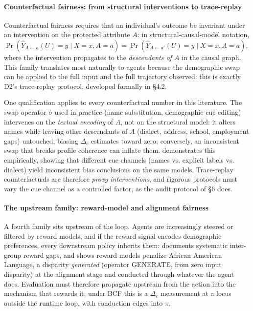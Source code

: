 \documentclass[acmsmall,nonacm]{acmart}
\begin{document}
\paragraph{Counterfactual fairness: from structural interventions to trace-replay}

Counterfactual fairness \cite{kusner2017counterfactual} requires that an individual's outcome be invariant under an intervention on the protected attribute $A$: in structural-causal-model notation, $\Pr(\hat{Y}_{A \leftarrow a}(U) = y \mid X = x, A = a) = \Pr(\hat{Y}_{A \leftarrow a'}(U) = y \mid X = x, A = a)$, where the intervention propagates to the \emph{descendants of $A$} in the causal graph. This family translates most naturally to agents because the demographic swap can be applied to the full input and the full trajectory observed: this is exactly D2's trace-replay protocol, developed formally in \S{}4.2.

One qualification applies to every counterfactual number in this literature. The swap operator $\sigma$ used in practice (name substitution, demographic-cue editing) intervenes on the \emph{textual encoding} of $A$, not on the structural model: it alters names while leaving other descendants of $A$ (dialect, address, school, employment gaps) untouched, biasing $\Delta_c$ estimates toward zero; conversely, an inconsistent swap that breaks profile coherence can inflate them. \cite{tonneau2026different} demonstrates this empirically, showing that different cue channels (names vs. explicit labels vs. dialect) yield inconsistent bias conclusions on the same models. Trace-replay counterfactuals are therefore \emph{proxy interventions}, and rigorous protocols must vary the cue channel as a controlled factor, as the audit protocol of \S{}6 does.

\paragraph{The upstream family: reward-model and alignment fairness}

A fourth family sits upstream of the loop. Agents are increasingly steered or filtered by reward models, and if the reward signal encodes demographic preferences, every downstream policy inherits them: \cite{song2025large} documents systematic inter-group reward gaps, and \cite{mire2025rejected} shows reward models penalize African American Language, a disparity \emph{generated} (operator GENERATE, from zero input disparity) at the alignment stage and conducted through whatever the agent does. Evaluation must therefore propagate upstream from the action into the mechanism that rewards it; under BCF this is a $\Delta_c$ measurement at a locus outside the runtime loop, with conduction edges into $\pi$.
\end{document}
